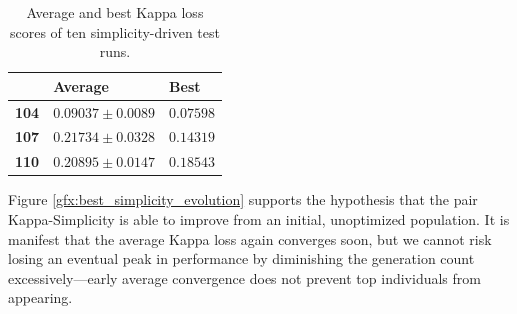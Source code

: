     \vspace{0.3cm}

    \begin{table}[h]

        \centering
        \setlength\arrayrulewidth{0.8pt}

        \begin{tabular}{| >{\centering\arraybackslash}m{0.7in} | >{\centering\arraybackslash}m{1.1in} | >{\centering\arraybackslash}m{1.1in} |}

			\hline
			\rowcolor{RoyalBlue}
			 & \textbf{Average} & \textbf{Best} \\
            \hline
            \cellcolor{RoyalBlue}\textbf{104} & $0.09037 \pm 0.0089$ & $0.07598$ \\
            \hline
            \cellcolor{RoyalBlue}\textbf{107} & $0.21734 \pm 0.0328$ & $0.14319$ \\
            \hline
            \cellcolor{RoyalBlue}\textbf{110} & $0.20895 \pm 0.0147$ & $0.18543$ \\
            \hline

        \end{tabular}

        \caption{Average and best Kappa loss scores of ten simplicity-driven test runs.}\label{table:average_peak_kappa_simplicity}

    \end{table}

    Figure \ref{gfx:best_simplicity_evolution} supports the hypothesis that the pair Kappa-Simplicity is able to improve from an initial, unoptimized population. It is manifest that the average Kappa loss again converges soon, but we cannot risk losing an eventual peak in performance by diminishing the generation count excessively---early average convergence does not prevent top individuals from appearing.

    \vspace{0.2cm}

